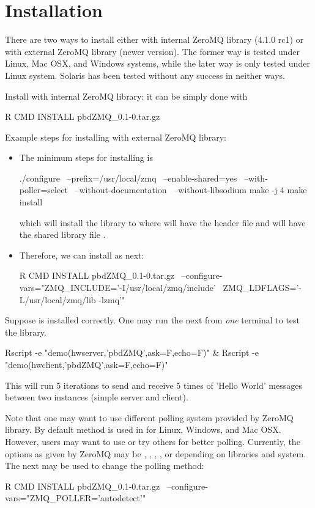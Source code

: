 \section[Installation]{Installation}
\label{sec:installation}

There are two ways to install  either with internal ZeroMQ library
(4.1.0 rc1) or with external ZeroMQ library (newer version).
The former way is tested under Linux, Mac OSX, and Windows systems, while
the later way is only tested under Linux system. Solaris has been tested
without any success in neither ways.

Install with internal ZeroMQ library: it can be simply done with
\begin{Command}
R CMD INSTALL pbdZMQ_0.1-0.tar.gz
\end{Command}

Example steps for installing with external ZeroMQ library:
\begin{itemize}
\item The minimum steps for installing  is
\begin{Command}
./configure \
   --prefix=/usr/local/zmq \
   --enable-shared=yes \
   --with-poller=select \
   --without-documentation \
   --without-libsodium
make -j 4
make install
\end{Command}
which will install the library to  where
 will have the header file  and
 will have the shared library file .

\item Therefore, we can install  as next:
\begin{Command}
R CMD INSTALL pbdZMQ_0.1-0.tar.gz \
  --configure-vars="ZMQ_INCLUDE='-I/usr/local/zmq/include' \
                    ZMQ_LDFLAGS='-L/usr/local/zmq/lib -lzmq'"
\end{Command}

\end{itemize}

Suppose \pkg{pbdZMQ} is installed correctly. One may run the next from
{\em one} terminal to test the library.
\begin{Command}
Rscript -e "demo(hwserver,'pbdZMQ',ask=F,echo=F)" &
Rscript -e "demo(hwclient,'pbdZMQ',ask=F,echo=F)"
\end{Command}
This will run 5 iterations to send and receive 5 times of
'Hello World' messages between two instances (simple server and client).

Note that one may want to use different polling system provided by 
ZeroMQ library.
By default \code{select} method is used in  for Linux, Windows, and
Mac OSX. However, users may want to use  or try others for
better polling. Currently, the options as given by ZeroMQ may be ,
\code{epoll}, \code{devpoll}, \code{poll}, or \code{select} depending on
libraries and system. The next may be used to change the polling method:
\begin{Command}
R CMD INSTALL pbdZMQ_0.1-0.tar.gz \
  --configure-vars="ZMQ_POLLER='autodetect'"
\end{Command}

